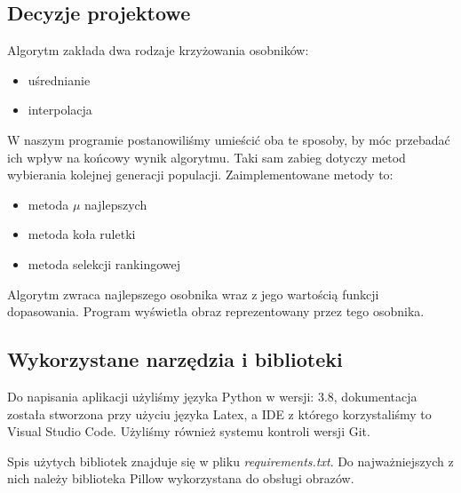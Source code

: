 \subsection{Decyzje projektowe}
Algorytm zakłada dwa rodzaje krzyżowania osobników:
\begin{itemize}
    \item uśrednianie
    \item interpolacja
\end{itemize}
W naszym programie postanowiliśmy umieścić oba te sposoby, by móc przebadać ich wpływ na końcowy wynik algorytmu.
Taki sam zabieg dotyczy metod wybierania kolejnej generacji populacji. Zaimplementowane metody to:
\begin{itemize}
    \item metoda $\mu$ najlepszych
    \item metoda koła ruletki
    \item metoda selekcji rankingowej
\end{itemize}
Algorytm zwraca najlepszego osobnika wraz z jego wartością funkcji dopasowania. Program wyświetla obraz reprezentowany przez tego osobnika.
\subsection{Wykorzystane narzędzia i biblioteki}
Do napisania aplikacji użyliśmy języka Python w wersji: 3.8, dokumentacja została stworzona przy użyciu języka Latex, a IDE z którego korzystaliśmy to Visual Studio Code. Użyliśmy również systemu kontroli wersji Git.

Spis użytych bibliotek znajduje się w pliku {\it requirements.txt}.
Do najważniejszych z nich należy biblioteka Pillow wykorzystana do obsługi obrazów.